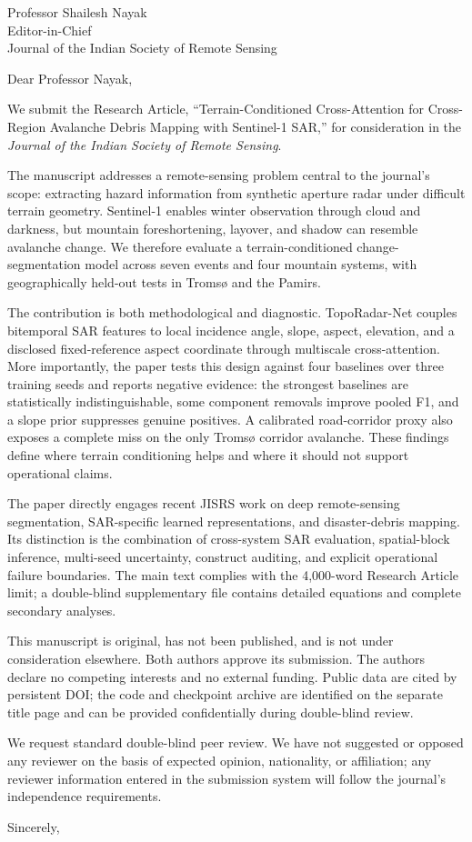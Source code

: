 \documentclass[10pt,a4paper]{letter}
\begin{document}
\sloppy
\begin{letter}{Professor Shailesh Nayak\\Editor-in-Chief\\Journal of the Indian Society of Remote Sensing}
\opening{Dear Professor Nayak,}

We submit the Research Article, ``Terrain-Conditioned Cross-Attention for Cross-Region Avalanche Debris Mapping with Sentinel-1 SAR,'' for consideration in the \textit{Journal of the Indian Society of Remote Sensing}.

The manuscript addresses a remote-sensing problem central to the journal's scope: extracting hazard information from synthetic aperture radar under difficult terrain geometry. Sentinel-1 enables winter observation through cloud and darkness, but mountain foreshortening, layover, and shadow can resemble avalanche change. We therefore evaluate a terrain-conditioned change-segmentation model across seven events and four mountain systems, with geographically held-out tests in Troms{\o} and the Pamirs.

The contribution is both methodological and diagnostic. TopoRadar-Net couples bitemporal SAR features to local incidence angle, slope, aspect, elevation, and a disclosed fixed-reference aspect coordinate through multiscale cross-attention. More importantly, the paper tests this design against four baselines over three training seeds and reports negative evidence: the strongest baselines are statistically indistinguishable, some component removals improve pooled F1, and a slope prior suppresses genuine positives. A calibrated road-corridor proxy also exposes a complete miss on the only Troms{\o} corridor avalanche. These findings define where terrain conditioning helps and where it should not support operational claims.

The paper directly engages recent JISRS work on deep remote-sensing segmentation, SAR-specific learned representations, and disaster-debris mapping. Its distinction is the combination of cross-system SAR evaluation, spatial-block inference, multi-seed uncertainty, construct auditing, and explicit operational failure boundaries. The main text complies with the 4,000-word Research Article limit; a double-blind supplementary file contains detailed equations and complete secondary analyses.

This manuscript is original, has not been published, and is not under consideration elsewhere. Both authors approve its submission. The authors declare no competing interests and no external funding. Public data are cited by persistent DOI; the code and checkpoint archive are identified on the separate title page and can be provided confidentially during double-blind review.

We request standard double-blind peer review. We have not suggested or opposed any reviewer on the basis of expected opinion, nationality, or affiliation; any reviewer information entered in the submission system will follow the journal's independence requirements.

\closing{Sincerely,}
\end{letter}
\end{document}
